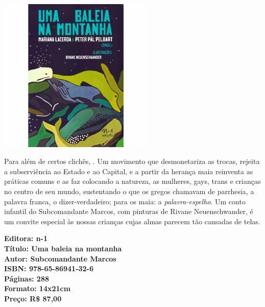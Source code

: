 \begin{center}
\hspace*{-3.6cm}
\hspace*{3.1cm}\includegraphics[width=74mm]{./CAPAS/N-1_BALEIA.jpg}
\end{center}

\hspace*{-7cm}\hrulefill\hspace*{-7cm}

\medskip

\noindent{}Para além de certos clichês, . Um movimento que desmonetariza as trocas, rejeita a subserviência ao Estado e ao Capital, e a partir da herança maia reinventa as práticas comuns e as faz colocando a natureza, as mulheres, gays, trans e crianças no centro de seu mundo, sustentando o que os gregos chamavam de parrhesia, a palavra franca, o dizer-verdadeiro; para os maia: a \textit{palavra-espelho}. Um conto infantil do Subcomandante Marcos, com pinturas de Rivane Neuenschwander, é um convite especial às nossas crianças cujas almas parecem tão cansadas de telas.

\vfill

\hspace*{-.4cm}\begin{minipage}[c]{.5\linewidth}
\small\textbf{
\hspace*{-.1cm}Editora: n-1\\
Título: Uma baleia na montanha\\
Autor: Subcomandante Marcos\\ 
ISBN: 978-65-86941-32-6\\
Páginas: 288\\
Formato: 14x21cm\\
Preço: R\$ 87,00\\
}
\end{minipage}

